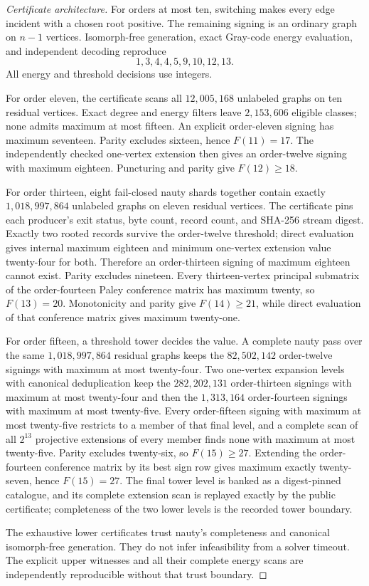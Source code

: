 \documentclass[11pt]{article}
\theoremstyle{remark}
\begin{document}
\begin{proof}[Certificate architecture]
For orders at most ten, switching makes every edge incident with a chosen
root positive.  The remaining signing is an ordinary graph on $n-1$
vertices.  Isomorph-free generation, exact Gray-code energy evaluation, and
independent decoding reproduce
\[
 1,3,4,4,5,9,10,12,13.
\]
All energy and threshold decisions use integers.

For order eleven, the certificate scans all $12{,}005{,}168$ unlabeled
graphs on ten residual vertices.  Exact degree and energy filters leave
$2{,}153{,}606$ eligible classes; none admits maximum at most fifteen.  An
explicit order-eleven signing has maximum seventeen.  Parity excludes
sixteen, hence $F(11)=17$.  The independently checked one-vertex extension
then gives an order-twelve signing with maximum eighteen.  Puncturing and
parity give $F(12)\ge18$.

For order thirteen, eight fail-closed nauty shards together contain exactly
$1{,}018{,}997{,}864$ unlabeled graphs on eleven residual vertices.  The
certificate pins each producer's exit status, byte count, record count, and
SHA-256 stream digest.  Exactly two rooted records survive the order-twelve
threshold; direct evaluation gives internal maximum eighteen and minimum
one-vertex extension value twenty-four for both.  Therefore an order-thirteen
signing of maximum eighteen cannot exist.  Parity excludes nineteen.  Every
thirteen-vertex principal submatrix of the order-fourteen Paley conference
matrix has maximum twenty, so $F(13)=20$.  Monotonicity and parity give
$F(14)\ge21$, while direct evaluation of that conference matrix gives
maximum twenty-one.

For order fifteen, a threshold tower decides the value.  A complete nauty
pass over the same $1{,}018{,}997{,}864$ residual graphs keeps the
$82{,}502{,}142$ order-twelve signings with maximum at most twenty-four.
Two one-vertex expansion levels with canonical deduplication keep the
$282{,}202{,}131$ order-thirteen signings with maximum at most twenty-four
and then the $1{,}313{,}164$ order-fourteen signings with maximum at most
twenty-five.  Every order-fifteen signing with maximum at most twenty-five
restricts to a member of that final level, and a complete scan of all
$2^{13}$ projective extensions of every member finds none with maximum at
most twenty-five.  Parity excludes twenty-six, so $F(15)\ge27$.  Extending
the order-fourteen conference matrix by its best sign row gives maximum
exactly twenty-seven, hence $F(15)=27$.  The final tower level is banked as
a digest-pinned catalogue, and its complete extension scan is replayed
exactly by the public certificate; completeness of the two lower levels is
the recorded tower boundary.

The exhaustive lower certificates trust nauty's completeness and canonical
isomorph-free generation.  They do not infer infeasibility from a solver
timeout.  The explicit upper witnesses and all their complete energy scans
are independently reproducible without that trust boundary.
\end{proof}
\end{document}
